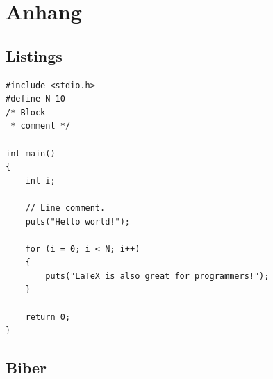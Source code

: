 \documentclass[12pt,DIV=15,BCOR=15mm,twoside,headsepline,abstract=true,listof=totoc,bibliography=totoc]{scrreprt}
\theoremstyle{remark}	%
\begin{document}
\cleardoublepage

\chapter{Anhang}
\section{Listings}

\lstset{language=C}
 \begin{lstlisting}[caption=C Code - direkt eingefügt, label=list:C]
#include <stdio.h>
#define N 10
/* Block
 * comment */

int main()
{
    int i;

    // Line comment.
    puts("Hello world!");
    
    for (i = 0; i < N; i++)
    {
        puts("LaTeX is also great for programmers!");
    }

    return 0;
}
\end{lstlisting}




\lstset{language=Java}



% 

\section{Biber}
\label{sec:biber}

\end{document}
